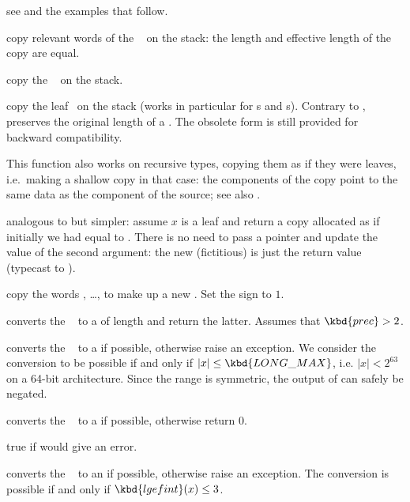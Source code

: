  see  and the examples that
follow.


 copy relevant words of the ~ on the
stack: the length and effective length of the copy are equal.

 copy the ~ on the stack.

 copy the leaf~ on the
stack (works in particular for s and s).
Contrary to ,  preserves the original
length of a . The obsolete form 
is still provided for backward compatibility.

This function also works on recursive types, copying them as if they were
leaves, i.e.~making a shallow copy in that case: the components of the copy
point to the same data as the component of the source; see also
.

 analogous to 
but simpler: assume $x$ is a leaf and return a copy allocated as if
initially we had  equal to . There is no need to pass a
pointer and update the value of the second argument: the new (fictitious)
 is just the return value (typecast to ).

 copy the  words
, \dots,  to make up a new . Set the sign
to $1$.


 converts the ~ to a
 of length  and return the latter.
Assumes that $\kbd{prec} > 2$.

 converts the ~ to a  if
possible, otherwise raise an exception. We consider the conversion
to be possible if and only if $|x| \leq \kbd{LONG\_MAX}$, i.e. $|x| < 2^{63}$
on a 64-bit architecture. Since the range is symmetric, the output of
 can safely be negated.

 converts the ~ to a  if
possible, otherwise return $0$.

 true if  would give an error.

 converts the ~ to an  if
possible, otherwise raise an exception. The conversion is possible if
and only if $\kbd{lgefint}(x) \leq 3$.

